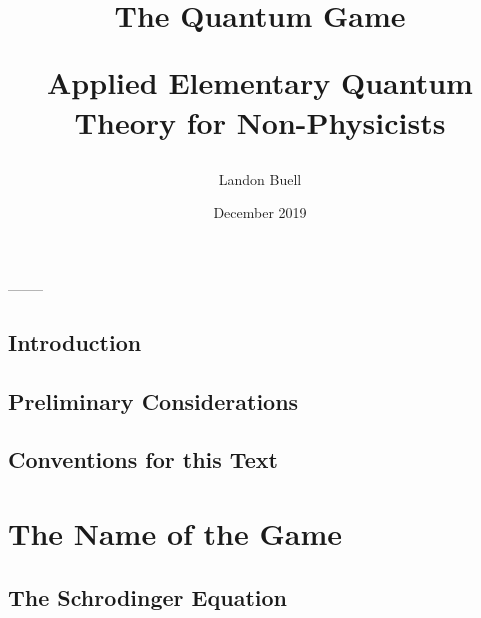 \documentclass[12pt,letterpaper]{book}
\begin{document}

\title{
\begin{Huge}
The Quantum Game\\
\end{Huge}
\vspace*{5mm}
\Large Applied Elementary Quantum Theory for Non-Physicists}
\author{Landon Buell}
\date{December 2019}
\maketitle



\begin{center}
--------
\end{center}


\tableofcontents
\pagebreak


\section*{Introduction}


\section*{Preliminary Considerations}


\section*{Conventions for this Text}


\chapter{The Name of the Game}


\section{The Schrodinger Equation}
\end{document}
